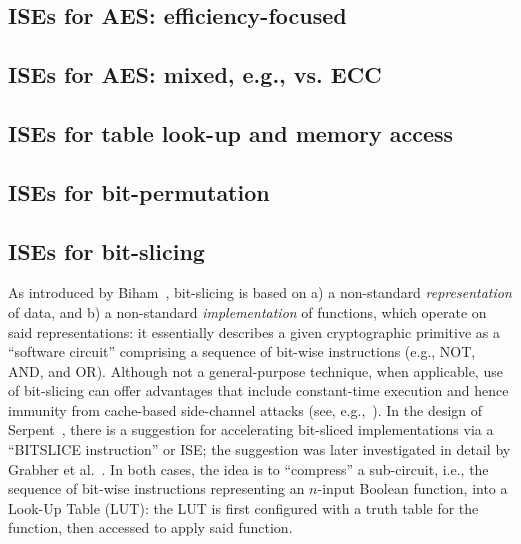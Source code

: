 \subsection*{ISEs for AES: efficiency-focused}
\cite{SCARV:TilGroSze:05,SCARV:TilGro:06,SCARV:APRJ:11}
\subsection*{ISEs for AES: mixed, e.g., vs. ECC}
\cite{SCARV:TilGro:05,SCARV:TilGro:07:b}

\subsection*{ISEs for table look-up and memory access}
\cite{SCARV:FisLee:01,SCARV:FisLee:05:a,SCARV:FisLee:05:b,SCARV:HilYinLee:08}

\subsection*{ISEs for bit-permutation}
\cite{SCARV:ShiLee:00,SCARV:YanLee:00,SCARV:McGLee:01,SCARV:LeeShiYan:01,SCARV:ShiLee:02,SCARV:ShiYanLee:03,SCARV:LSYRR:04,MASCAB:LeeYanShi:05,SCARV:HilYinLee:08,SCARV:HilLee:08,SCARV:ShiYanLee:08}
\subsection*{ISEs for bit-slicing}
As introduced by Biham~\cite{SCARV:Biham:97}, bit-slicing is based on
a) a non-standard {\em representation} of data,
   and
b) a non-standard {\em implementation} of functions, which operate on
   said representations:
it essentially describes a given cryptographic primitive as a  ``software 
circuit'' comprising a sequence of bit-wise instructions (e.g., NOT, AND, 
and OR).  Although not a general-purpose technique, when applicable, use
of bit-slicing can offer advantages that include constant-time execution 
and hence immunity from cache-based side-channel attacks
(see, e.g.,~\cite{SCARV:KasSch:09}).
In the design of Serpent~\cite[Page 232]{SCARV:BihAndKnu:98}, there is a
suggestion for accelerating bit-sliced implementations via a ``BITSLICE 
instruction'' or ISE; the suggestion was later investigated in detail by 
Grabher et al.~\cite{SCARV:GraGroPag:08}.  In both cases, the idea is to 
``compress'' a sub-circuit, i.e., the sequence of bit-wise instructions 
representing an $n$-input Boolean function, into a Look-Up Table (LUT): 
the LUT is first configured with a truth table for the function, then 
accessed to apply said function.  

